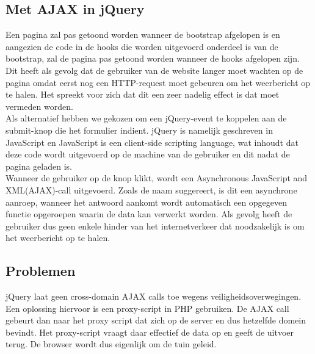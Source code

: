 \subsection{Met AJAX in jQuery}

Een pagina zal pas getoond worden wanneer de bootstrap afgelopen is en aangezien de code in de hooks die worden uitgevoerd onderdeel is van de bootstrap, zal de pagina pas getoond worden wanneer de hooks afgelopen zijn. Dit heeft als gevolg dat de gebruiker van de website langer moet wachten op de pagina omdat eerst nog een HTTP-request moet gebeuren om het weerbericht op te halen. Het spreekt voor zich dat dit een zeer nadelig effect is dat moet vermeden worden.\\
Als alternatief hebben we gekozen om een jQuery-event te koppelen aan de submit-knop die het formulier indient. jQuery is namelijk geschreven in JavaScript en JavaScript is een client-side scripting language, wat inhoudt dat deze code wordt uitgevoerd op de machine van de gebruiker en dit nadat de pagina geladen is.\\
Wanneer de gebruiker op de knop klikt, wordt een Asynchronous JavaScript and XML(AJAX)-call uitgevoerd.
Zoals de naam suggereert, is dit een asynchrone aanroep, wanneer het antwoord aankomt wordt automatisch een opgegeven functie opgeroepen waarin de data kan verwerkt worden. Als gevolg heeft de gebruiker dus geen enkele hinder van het internetverkeer dat noodzakelijk is om het weerbericht op te halen.


\subsection{Problemen}

jQuery laat geen cross-domain AJAX calls toe wegens veiligheidsoverwegingen. Een oplossing hiervoor is een proxy-script in PHP gebruiken.
De AJAX call gebeurt dan naar het proxy script dat zich op de server en dus hetzelfde domein bevindt. Het proxy-script vraagt daar effectief de data op en geeft de uitvoer terug.
De browser wordt dus eigenlijk om de tuin geleid. \cite{cross-domainProblem}
